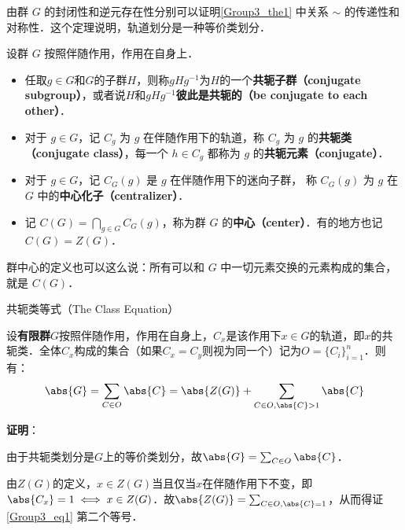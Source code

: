 由群 $G$ 的封闭性和逆元存在性分别可以证明\autoref{Group3_the1} 中关系 $\sim$ 的传递性和对称性．这个定理说明，轨道划分是一种等价类划分．






\begin{definition}{}
设群 $G$ 按照伴随作用，作用在自身上．
\begin{itemize}
\item 任取$g\in G$和$G$的子群$H$，则称$gHg^{-1}$为$H$的一个\textbf{共轭子群（conjugate subgroup）}，或者说$H$和$gHg^{-1}$\textbf{彼此是共轭的（be conjugate to each other）}．
\item 对于 $g\in G$，记 $C_g$ 为 $g$ 在伴随作用下的轨道，称 $C_g$ 为 $g$ 的\textbf{共轭类（conjugate class）}，每一个 $h\in C_g$ 都称为 $g$ 的\textbf{共轭元素（conjugate）}．

\item 对于 $g\in G$，记 $C_G(g)$ 是 $g$ 在伴随作用下的迷向子群， 称 $C_G(g)$ 为 $g$ 在 $G$ 中的\textbf{中心化子（centralizer）}．

\item 记 $C(G)=\bigcap_{g\in G} C_G(g)$，称为群 $G$ 的\textbf{中心（center）}．有的地方也记$C(G)=Z(G)$．
\end{itemize}
\end{definition}

群中心的定义也可以这么说：所有可以和 $G$ 中一切元素交换的元素构成的集合，就是 $C(G)$．








\begin{theorem}{共轭类等式（The Class Equation）}\label{Group3_the4}

设\textbf{有限群}$G$按照伴随作用，作用在自身上，$C_x$是该作用下$x\in G$的轨道，即$x$的共轭类．全体$C_x$构成的集合（如果$C_x=C_y$则视为同一个）记为$O=\{C_i\}_{i=1}^n$．则有：
\begin{equation}\label{Group3_eq1}
\abs{G} = \sum_{C\in O} \abs{C} = \abs{Z(G)} + \sum_{C\in O, \abs{C}>1} \abs{C}
\end{equation}

\end{theorem}


\textbf{证明}：

由于共轭类划分是$G$上的等价类划分，故$\abs{G} = \sum_{C\in O} \abs{C}$．

由$Z(G)$的定义，$x\in Z(G)$当且仅当$x$在伴随作用下不变，即$\abs{C_x}=1\iff x\in Z(G)$．故$\abs{Z(G)}=\sum_{C\in O, \abs{C}=1}$，从而得证\autoref{Group3_eq1} 第二个等号．

